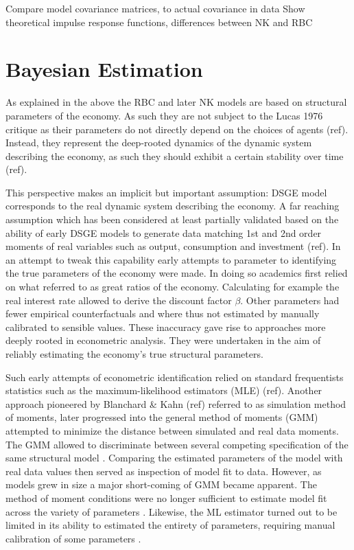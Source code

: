 \documentclass[12pt,a4paper,english]{article} %
\let\oldsection\section
\renewcommand\section{\clearpage\oldsection}
\begin{document}
	Compare model covariance matrices, to actual covariance in data
	Show theoretical impulse response functions, differences between NK and RBC
			
	\section{Bayesian Estimation}
		
	As explained in the above the RBC and later NK models are based on structural parameters of the economy. As such they are not subject to the Lucas 1976 critique as their parameters do not  directly depend on the choices of agents (ref). Instead, they represent the deep-rooted dynamics of the dynamic system describing the economy, as such they should exhibit a certain stability over time (ref). 
	
	This perspective makes an implicit but important assumption: DSGE model corresponds to the real dynamic system describing the economy. A far reaching assumption which has been considered at least partially validated based on the ability of early DSGE models to generate data matching 1st and 2nd order moments of real variables such as output, consumption and investment (ref). 
	In an attempt to tweak this capability  early attempts to parameter to identifying the true parameters of the economy were made. In doing so academics first relied on what \cite{prescott_theory_1986} referred to as great ratios of the economy. Calculating for example the real interest rate allowed to derive the discount factor $\beta$. 
	Other parameters had fewer empirical counterfactuals and where thus not estimated by manually calibrated to sensible values. These inaccuracy gave rise to approaches more deeply rooted in econometric analysis. They were undertaken in the aim of reliably estimating the economy's true structural parameters.
	
	Such early attempts of econometric identification relied on standard frequentists statistics such as the maximum-likelihood estimators (MLE) (ref). Another approach pioneered by Blanchard \& Kahn (ref) referred to as simulation method of moments, later progressed into the general method of moments (GMM) attempted to minimize the distance between simulated and real data moments. The GMM allowed to discriminate between several competing specification of the same structural model \cite{christiano_current_1992}. Comparing the estimated parameters of the model with real data values then served as inspection of model fit to data. However, as models grew in size a major short-coming of GMM became apparent. The method of moment conditions were no longer sufficient to estimate model fit across the variety of parameters \cite{guerron-quintana_bayesian_2013}. Likewise, the ML estimator turned out to be limited in its ability to estimated the entirety of parameters, requiring manual calibration of some parameters \cite{guerron-quintana_bayesian_2013}.
	
\end{document}
